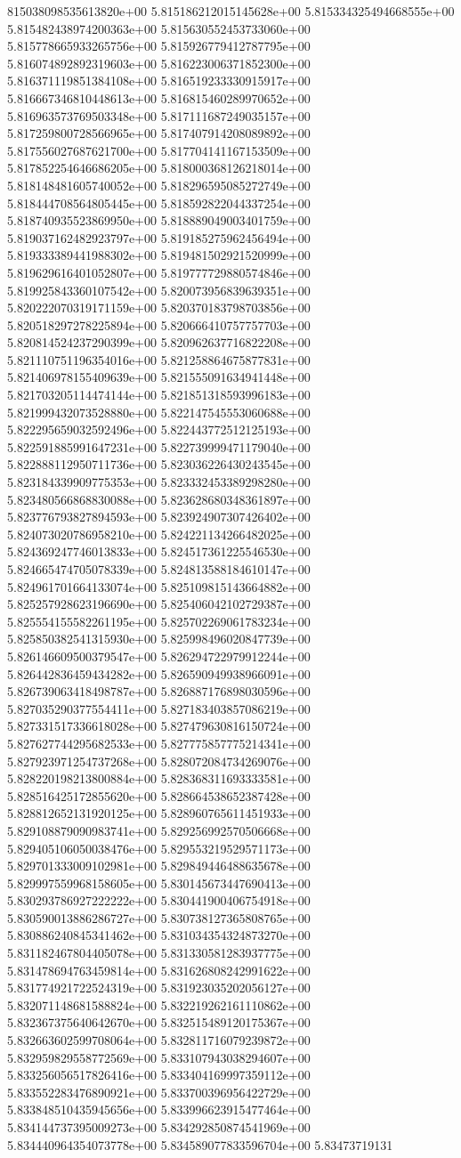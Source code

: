 815038098535613820e+00	5.815186212015145628e+00	5.815334325494668555e+00	5.815482438974200363e+00	5.815630552453733060e+00	5.815778665933265756e+00	5.815926779412787795e+00	5.816074892892319603e+00	5.816223006371852300e+00	5.816371119851384108e+00	5.816519233330915917e+00	5.816667346810448613e+00	5.816815460289970652e+00	5.816963573769503348e+00	5.817111687249035157e+00	5.817259800728566965e+00	5.817407914208089892e+00	5.817556027687621700e+00	5.817704141167153509e+00	5.817852254646686205e+00	5.818000368126218014e+00	5.818148481605740052e+00	5.818296595085272749e+00	5.818444708564805445e+00	5.818592822044337254e+00	5.818740935523869950e+00	5.818889049003401759e+00	5.819037162482923797e+00	5.819185275962456494e+00	5.819333389441988302e+00	5.819481502921520999e+00	5.819629616401052807e+00	5.819777729880574846e+00	5.819925843360107542e+00	5.820073956839639351e+00	5.820222070319171159e+00	5.820370183798703856e+00	5.820518297278225894e+00	5.820666410757757703e+00	5.820814524237290399e+00	5.820962637716822208e+00	5.821110751196354016e+00	5.821258864675877831e+00	5.821406978155409639e+00	5.821555091634941448e+00	5.821703205114474144e+00	5.821851318593996183e+00	5.821999432073528880e+00	5.822147545553060688e+00	5.822295659032592496e+00	5.822443772512125193e+00	5.822591885991647231e+00	5.822739999471179040e+00	5.822888112950711736e+00	5.823036226430243545e+00	5.823184339909775353e+00	5.823332453389298280e+00	5.823480566868830088e+00	5.823628680348361897e+00	5.823776793827894593e+00	5.823924907307426402e+00	5.824073020786958210e+00	5.824221134266482025e+00	5.824369247746013833e+00	5.824517361225546530e+00	5.824665474705078339e+00	5.824813588184610147e+00	5.824961701664133074e+00	5.825109815143664882e+00	5.825257928623196690e+00	5.825406042102729387e+00	5.825554155582261195e+00	5.825702269061783234e+00	5.825850382541315930e+00	5.825998496020847739e+00	5.826146609500379547e+00	5.826294722979912244e+00	5.826442836459434282e+00	5.826590949938966091e+00	5.826739063418498787e+00	5.826887176898030596e+00	5.827035290377554411e+00	5.827183403857086219e+00	5.827331517336618028e+00	5.827479630816150724e+00	5.827627744295682533e+00	5.827775857775214341e+00	5.827923971254737268e+00	5.828072084734269076e+00	5.828220198213800884e+00	5.828368311693333581e+00	5.828516425172855620e+00	5.828664538652387428e+00	5.828812652131920125e+00	5.828960765611451933e+00	5.829108879090983741e+00	5.829256992570506668e+00	5.829405106050038476e+00	5.829553219529571173e+00	5.829701333009102981e+00	5.829849446488635678e+00	5.829997559968158605e+00	5.830145673447690413e+00	5.830293786927222222e+00	5.830441900406754918e+00	5.830590013886286727e+00	5.830738127365808765e+00	5.830886240845341462e+00	5.831034354324873270e+00	5.831182467804405078e+00	5.831330581283937775e+00	5.831478694763459814e+00	5.831626808242991622e+00	5.831774921722524319e+00	5.831923035202056127e+00	5.832071148681588824e+00	5.832219262161110862e+00	5.832367375640642670e+00	5.832515489120175367e+00	5.832663602599708064e+00	5.832811716079239872e+00	5.832959829558772569e+00	5.833107943038294607e+00	5.833256056517826416e+00	5.833404169997359112e+00	5.833552283476890921e+00	5.833700396956422729e+00	5.833848510435945656e+00	5.833996623915477464e+00	5.834144737395009273e+00	5.834292850874541969e+00	5.834440964354073778e+00	5.834589077833596704e+00	5.83473719131